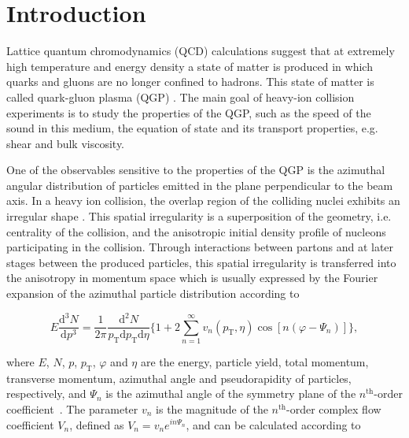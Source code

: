 \section{Introduction}
\label{Sec:Introduction}

Lattice quantum chromodynamics (QCD) calculations \cite{Borsanyi:2010cj,Bhattacharya:2014ara} suggest that at extremely high temperature and energy density a state of matter is produced in which quarks and gluons are no longer confined to hadrons. This state of matter is called quark-gluon plasma (QGP) \cite{Shuryak:1984nq, Cleymans:1985wb, Bass:1998vz}. The main goal of heavy-ion collision experiments is to study the properties of the QGP, such as the speed of the sound in this medium, the equation of state and its transport properties, e.g. shear and bulk viscosity.

One of the observables sensitive to the properties of the QGP is the azimuthal angular distribution of particles emitted in the plane perpendicular to the beam axis. In a heavy ion collision, the overlap region of the colliding nuclei exhibits an irregular shape \cite{Bhalerao:2006tp, Alver:2008zza, Alver:2010gr, Alver:2010dn, Manly:2005zy}. This spatial irregularity is a superposition of the geometry, i.e. centrality of the collision, and the anisotropic initial density profile of nucleons participating in the collision. Through interactions between partons and at later stages between the produced particles, this spatial irregularity is transferred into the anisotropy in momentum space which is usually expressed by the Fourier expansion of the azimuthal particle distribution according to

\begin{equation}
E\frac{\mathrm{d}^3N}{\mathrm{d}p^3} = \frac{1}{2\pi}\frac{\mathrm{d}^2N}{p_{\mathrm{T}}\mathrm{d}p_{\mathrm{T}}\mathrm{d}\eta} \Big\{1 + 2\sum_{n=1}^{\infty} v_n(p_{\mathrm{T}},\eta) \cos[n(\varphi - \Psi_n)]\Big\},
\label{Eq:Fourier}
\end{equation}

\noindent where $E$, $N$, $p$, $p_{\mathrm{T}}$, $\varphi$ and $\eta$ are the energy, particle yield, total momentum, transverse momentum, azimuthal angle and pseudorapidity of particles, respectively, and $\Psi_n$ is the azimuthal angle of the symmetry plane of the $n^{\mathrm{th}}$-order coefficient~\cite{Bhalerao:2006tp,Alver:2008zza,Alver:2010gr,Alver:2010dn}. The parameter $v_{n}$ is the magnitude of the $n^{\mathrm{th}}$-order complex flow coefficient $V_n$, defined as $V_{n} = v_{n}e^{in\Psi_n}$, and can be calculated according to 

